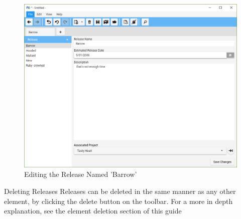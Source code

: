 \begin{figure}[H]
\centering
\includegraphics[width=\textwidth]{images/screenshots/releases4.PNG}
\caption{Editing the Release Named 'Barrow'}
\label{fig:new_project}
\end{figure}

Deleting Releases
\newline
Releases can be deleted in the same manner as any other element, by clicking the delete button on the toolbar. For a more in depth explanation, see the element deletion section of this guide
